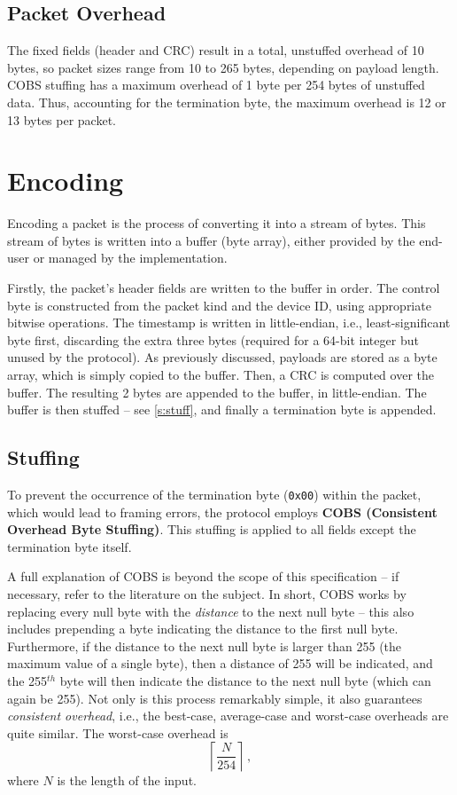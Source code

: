 \documentclass[a4paper,11pt,english]{article}
\begin{document}

\subsection[overhead]{Packet Overhead}

The fixed fields (header and CRC) result in a total, unstuffed overhead of 10 bytes, so packet sizes range from 10 to 265 bytes, depending on payload length. COBS stuffing has a maximum overhead of 1 byte per 254 bytes of unstuffed data. Thus, accounting for the termination byte, the maximum overhead is 12 or 13 bytes per packet.

\section[enc]{Encoding}

Encoding a packet is the process of converting it into a stream of bytes. This stream of bytes is written into a buffer (byte array), either provided by the end-user or managed by the implementation.

Firstly, the packet's header fields are written to the buffer in order. The control byte is constructed from the packet kind and the device ID, using appropriate bitwise operations. The timestamp is written in little-endian, i.e., least-significant byte first, discarding the extra three bytes (required for a 64-bit integer but unused by the protocol). As previously discussed, payloads are stored as a byte array, which is simply copied to the buffer. Then, a CRC is computed over the buffer. The resulting 2 bytes are appended to the buffer, in little-endian. The buffer is then stuffed -- see \cref{s:stuff}, and finally a termination byte is appended.

\subsection[stuff]{Stuffing}

To prevent the occurrence of the termination byte (\texttt{0x00}) within the packet, which would lead to framing errors, the protocol employs \textbf{COBS (Consistent Overhead Byte Stuffing)}. This stuffing is applied to all fields except the termination byte itself.

A full explanation of COBS is beyond the scope of this specification -- if necessary, refer to the literature on the subject. In short, COBS works by replacing every null byte with the \textit{distance} to the next null byte -- this also includes prepending a byte indicating the distance to the first null byte. Furthermore, if the distance to the next null byte is larger than 255 (the maximum value of a single byte), then a distance of 255 will be indicated, and the 255$^{th}$ byte will then indicate the distance to the next null byte (which can again be 255). Not only is this process remarkably simple, it also guarantees \textit{consistent overhead}, i.e., the best-case, average-case and worst-case overheads are quite similar. The worst-case overhead is
$$\left\lceil \frac{N}{254} \right\rceil\,,$$
where $N$ is the length of the input.
\end{document}
